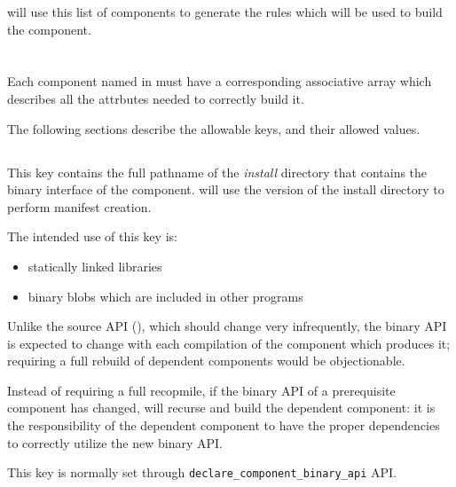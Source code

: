 \lmsbw will use this list of components to generate the rules which
will be used to build the component.

\section{}

Each component named in \lmsbwcomponents must have a corresponding
associative array which describes all the attrbutes needed to
correctly build it.

The following sections describe the allowable keys, and their allowed
values.

\subsection{}\label{lmsbwcomponent:binary-api}

This key contains the full pathname of the \emph{install} directory
that contains the binary interface of the component.  \lmsbw will use
the \destdir version of the install directory to perform \mtree
manifest creation.

The intended use of this key is:

\begin{itemize}
\item statically linked libraries
\item binary blobs which are included in other programs
\end{itemize}

Unlike the source API (), which should
change very infrequently, the binary API is expected to change with
each compilation of the component which produces it; requiring a full
rebuild of dependent components would be objectionable.

Instead of requiring a full recopmile, if the binary API of a
prerequisite component has changed, \lmsbw will recurse and build the
dependent component: it is the responsibility of the dependent
component to have the proper dependencies to correctly utilize the new
binary API.

This key is normally set through
\texttt{declare\_component\_binary\_api} API.

\subsection{}

